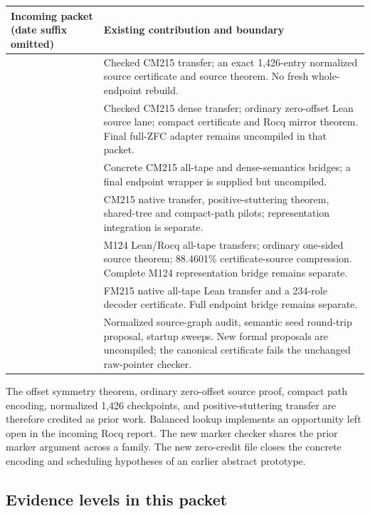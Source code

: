 \begin{longtable}{@{}P{.38\textwidth}P{.56\textwidth}@{}}
\toprule
Incoming packet (date suffix omitted) & Existing contribution and boundary\\
\midrule\endhead
{} & Checked CM215 transfer; an exact 1,426-entry
normalized source certificate and source theorem. No fresh whole-endpoint
rebuild.\\[4pt]
 & Checked CM215 dense transfer; ordinary
zero-offset Lean source lane; compact certificate and Rocq mirror theorem.
Final full-ZFC adapter remains uncompiled in that packet.\\[4pt]
 & Concrete CM215 all-tape and dense-semantics
bridges; a final endpoint wrapper is supplied but uncompiled.\\[4pt]
 & CM215 native transfer, positive-stuttering
theorem, shared-tree and compact-path pilots; representation integration is
separate.\\[4pt]
 & M124 Lean/Rocq all-tape transfers;
ordinary one-sided source theorem; 88.4601\% certificate-source compression.
Complete M124 representation bridge remains separate.\\[4pt]
 & FM215 native all-tape Lean transfer and a
234-role decoder certificate. Full endpoint bridge remains separate.\\[4pt]
 & Normalized source-graph audit,
semantic seed round-trip proposal, startup sweeps. New formal proposals are
uncompiled; the canonical certificate fails the unchanged raw-pointer checker.\\
\bottomrule
\end{longtable}

The offset symmetry theorem, ordinary zero-offset source proof, compact path
encoding, normalized 1,426 checkpoints, and positive-stuttering transfer are
therefore credited as prior work. Balanced lookup implements an opportunity
left open in the incoming Rocq report. The new marker checker shares the
prior marker argument across a family. The new zero-credit file closes the
concrete encoding and scheduling hypotheses of an earlier abstract prototype.

\subsection{Evidence levels in this packet}

